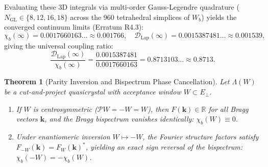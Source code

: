 \documentclass[11pt,a4paper]{article}
\newtheorem{theorem}{Theorem}[section]
\theoremstyle{definition}
\newcommand{\R}{\mathbb{R}}
\begin{document}
Evaluating these 3D integrals via multi-order Gauss-Legendre quadrature ($N_{\mathrm{GL}}\in\{8,12,16,18\}$ across the 960 tetrahedral simplices of $W_b$) yields the converged continuum limits (Erratum R4.3):
\begin{equation}
\chi_b(\infty) = 0.0017660163\dots \approx 0.001766, \quad \mathcal{D}_{\mathrm{Lap}}(\infty) = 0.0015387481\dots \approx 0.001539,
\end{equation}
giving the universal coupling ratio:
\begin{equation}
\frac{\mathcal{D}_{\mathrm{Lap}}(\infty)}{\chi_b(\infty)} = \frac{0.0015387481}{0.0017660163} = 0.8713103\dots \approx 0.8713.
\end{equation}

\begin{theorem}[Parity Inversion and Bispectrum Phase Cancellation]
\label{thm:bispectrum_cancellation}
Let $\Lambda(W)$ be a cut-and-project quasicrystal with acceptance window $W \subset E_\perp$.
\begin{enumerate}
    \item If $W$ is centrosymmetric ($\mathcal{P}W = -W = W$), then $F(\mathbf{k}) \in \R$ for all Bragg vectors $\mathbf{k}$, and the Bragg bispectrum vanishes identically: $\chi_b(W) \equiv 0$.
    \item Under enantiomeric inversion $W \mapsto -W$, the Fourier structure factors satisfy $F_{-W}(\mathbf{k}) = F_W(\mathbf{k})^*$, yielding an exact sign reversal of the bispectrum: $\chi_b(-W) = -\chi_b(W)$.
\end{enumerate}
\end{theorem}
\end{document}
